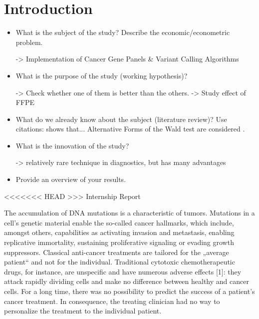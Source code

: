 \section{Introduction}

\begin{itemize}

\item What is the subject of the study? Describe the
economic/econometric problem.

-> Implementation of Cancer Gene Panels & Variant Calling Algorithms

\item What is the purpose of the study (working hypothesis)?

-> Check whether one of them is better than the others.
-> Study effect of FFPE

\item What do we already know about the subject (literature
review)? Use citations: { \cite{mutect:2013} shows that...
Alternative Forms of the Wald test are considered
\citep{Breusch&Schmidt:88}.}

\item What is the innovation of the study?

-> relatively rare technique in diagnostics, but has many advantages

\item Provide an overview of your results.


\end{itemize}

<<<<<<< HEAD
>>> Internship Report

The accumulation of DNA mutations is a characteristic of tumors. Mutations in a cell’s genetic material enable the so-called cancer hallmarks, which include, amongst others, capabilities as activating invasion and metastasis, enabling replicative immortality, sustaining proliferative signaling or evading growth suppressors. Classical anti-cancer treatments are tailored for the „average patient“ and not for the individual. Traditional cytotoxic chemotherapeutic drugs, for instance, are unspecific and have numerous adverse effects [1]: they attack rapidly dividing cells and make no difference between healthy and cancer cells. For a long time, there was no possibility to predict the success of a patient’s cancer treatment. In consequence, the treating clinician had no way to personalize the treatment to the individual patient.

